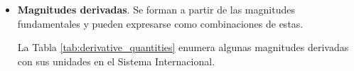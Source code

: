 \begin{itemize}


    \item \textbf{Magnitudes derivadas}.
    Se forman a partir de las magnitudes fundamentales y pueden expresarse como combinaciones de estas.

    La Tabla \ref{tab:derivative_quantities} enumera algunas magnitudes derivadas con sus unidades en el Sistema Internacional.


\end{itemize}
